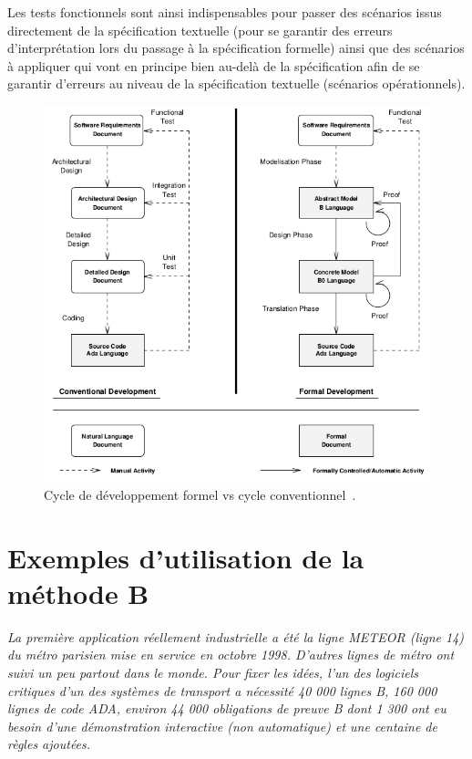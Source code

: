 \documentclass[10pt,a4paper]{article}
\begin{document}
Les tests fonctionnels sont ainsi indispensables pour passer des scénarios issus directement de la spécification textuelle (pour se garantir des erreurs d'interprétation lors du passage à la spécification formelle) ainsi que des scénarios à appliquer qui vont en principe bien au-delà de la spécification afin de se garantir d'erreurs au niveau de la spécification textuelle (scénarios opérationnels).

\begin{figure}[h]
\centering
\includegraphics[scale=0.70]{ressources/formal_dev.png}
\caption{\label{DifferentsCycles}
Cycle de développement formel vs cycle conventionnel~\cite[page 374]{behm1999meteor}.}
\end{figure}

\section{Exemples d'utilisation de la méthode B}

\emph{La première application réellement industrielle a été la ligne METEOR (ligne 14) du métro parisien mise en service en octobre 1998. D'autres lignes de métro ont suivi un peu partout dans le monde. Pour fixer les idées, l'un des logiciels critiques d'un des systèmes de transport a nécessité 40 000 lignes B, 160 000 lignes de code ADA, environ 44 000 obligations de preuve B dont 1 300 ont eu besoin d'une démonstration interactive (non automatique) et une centaine de règles ajoutées.}\cite{dossierTechnique}
\end{document}
